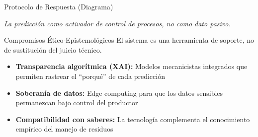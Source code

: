 \documentclass[aspectratio=169, 11pt]{beamer}
\begin{document}
\begin{frame}{Protocolo de Respuesta (Diagrama)}
    \centering
    \vspace{0.3cm}

    \footnotesize \textit{La predicción como activador de control de procesos, no como dato pasivo.}
\end{frame}

\begin{frame}{Compromisos Ético-Epistemológicos}
    El sistema es una herramienta de soporte, no de sustitución del juicio técnico.
    \vspace{0.3cm}
    \begin{itemize}
        \item \textbf{Transparencia algorítmica (XAI):} Modelos mecanicistas integrados que permiten rastrear el ``porqué'' de cada predicción
        \item \textbf{Soberanía de datos:} Edge computing para que los datos sensibles permanezcan bajo control del productor
        \item \textbf{Compatibilidad con saberes:} La tecnología complementa el conocimiento empírico del manejo de residuos
    \end{itemize}
\end{frame}

\end{document}
